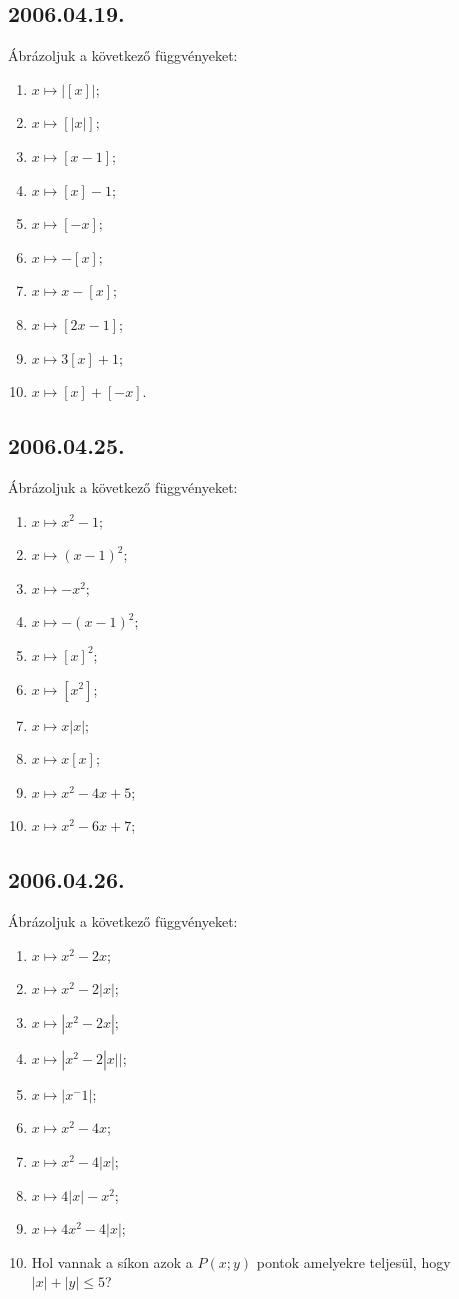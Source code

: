 \documentclass{article}
\begin{document}
\subsection*{2006.04.19.}
Ábrázoljuk a következő függvényeket:
\begin{enumerate}
\item $x \mapsto |[x]|$;
\item $x \mapsto [|x|]$;
\item $x \mapsto [x-1]$;
\item $x \mapsto [x]-1$;
\item $x \mapsto [-x]$;
\item $x \mapsto -[x]$;
\item $x \mapsto x-[x]$;
\item $x \mapsto [2x-1]$;
\item $x \mapsto 3[x]+1$;
\item $x \mapsto [x]+[-x]$.
\end{enumerate}

\subsection*{2006.04.25.}
Ábrázoljuk a következő függvényeket:
\begin{enumerate}
\item $x \mapsto x^2-1$;
\item $x \mapsto (x-1)^2$;
\item $x \mapsto -x^2$;
\item $x \mapsto -(x-1)^2$;
\item $x \mapsto [x]^2$;
\item $x \mapsto [x^2]$;
\item $x \mapsto x|x|$;
\item $x \mapsto x[x]$;
\item $x \mapsto x^2-4x+5$;
\item $x \mapsto x^2-6x+7$;
\end{enumerate}

\subsection*{2006.04.26.}
Ábrázoljuk a következő függvényeket:
\begin{enumerate}
\item $x \mapsto x^2-2x$;
\item $x \mapsto x^2-2|x|$;
\item $x \mapsto |x^2-2x|$;
\item $x \mapsto |x^2-2|x||$;
\item $x \mapsto |x^-1|$;
\item $x \mapsto x^2-4x$;
\item $x \mapsto x^2-4|x|$;
\item $x \mapsto 4|x|-x^2$;
\item $x \mapsto 4x^2-4|x|$;
\item Hol vannak a síkon azok a $P(x;y)$ pontok amelyekre teljesül, hogy $|x|+|y|\le5$?
\end{enumerate}
\end{document}
